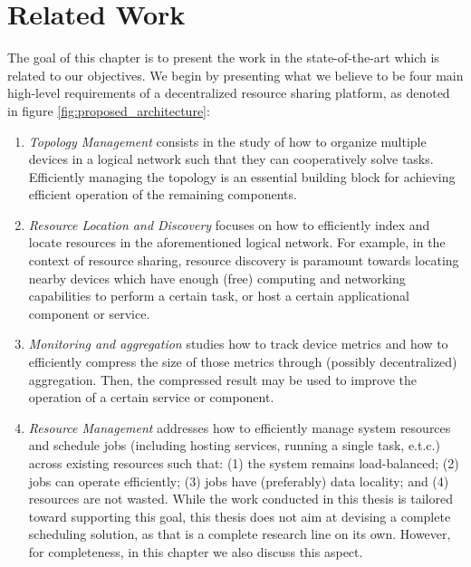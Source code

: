 \chapter{Related Work}
\label{cha:related_work}

The goal of this chapter is to present the work in the state-of-the-art which is related to our objectives. We begin by presenting what we believe to be four main high-level requirements of a decentralized resource sharing platform, as denoted in figure \ref{fig:proposed_architecture}:

\begin{enumerate}

    \item \textit{Topology Management} consists in the study of how to organize multiple devices in a logical network such that they can cooperatively solve tasks. Efficiently managing the topology is an essential building block for achieving efficient operation of the remaining components.

    \item \textit{Resource Location and Discovery} focuses on how to efficiently index and locate resources in the aforementioned logical network. For example, in the context of resource sharing, resource discovery is paramount towards locating nearby devices which have enough (free) computing and networking capabilities to perform a certain task, or host a certain applicational component or service.

    \item \textit{Monitoring and aggregation} studies how to track device metrics and how to efficiently compress the size of those metrics through (possibly decentralized) aggregation. Then, the compressed result may be used to improve the operation of a certain service or component.

    \item \textit{Resource Management} addresses how to efficiently manage system resources and schedule jobs (including hosting services, running a single task, e.t.c.) across existing resources such that: (1) the system remains load-balanced; (2) jobs can operate efficiently; (3) jobs have (preferably) data locality; and (4) resources are not wasted. While the work conducted in this thesis is tailored toward supporting this goal, this thesis does not aim at devising a complete scheduling solution, as that is a complete research line on its own. However, for completeness, in this chapter we also discuss this aspect.

\end{enumerate}

